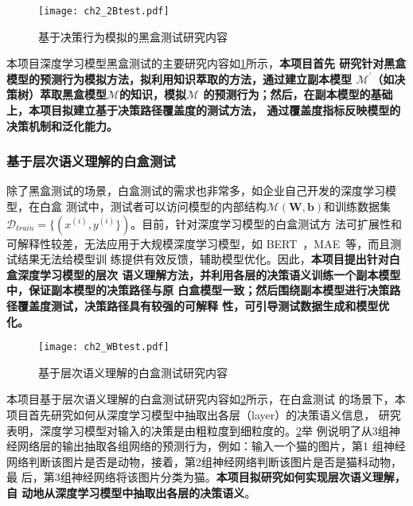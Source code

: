 \begin{figure}[htp]
    \begin{small}
        \begin{center}
            \texttt{[image: ch2\_2Btest.pdf]}
        \end{center}
        \caption{基于决策行为模拟的黑盒测试研究内容}
        \label{fig:ch2:2Btest}
    \end{small}
\end{figure}
本项目深度学习模型黑盒测试的主要研究内容如\cref{fig:ch2:2Btest}所示，\textbf{本项目首先
研究针对黑盒模型的预测行为模拟方法，拟利用知识萃取的方法，通过建立副本模型
$\mathcal M^\prime$（如决策树）萃取黑盒模型$\mathcal M$的知识，模拟$\mathcal M$
的预测行为；然后，在副本模型的基础上，本项目拟建立基于决策路径覆盖度的测试方法，
通过覆盖度指标反映模型的决策机制和泛化能力。}

\subsubsection{基于层次语义理解的白盒测试}

除了黑盒测试的场景，白盒测试的需求也非常多，如企业自己开发的深度学习模型，在白盒
测试中，测试者可以访问模型的内部结构$\mathcal M(\bm W, \bm b)$和训练数据集
$\mathcal D_{train}=\{(x^{(i)}, y^{(i)}\})$。目前，针对深度学习模型的白盒测试方
法可扩展性和可解释性较差，无法应用于大规模深度学习模型，如
BERT~\cite{kenton2019bert}，MAE~\cite{he2021masked}等，而且测试结果无法给模型训
练提供有效反馈，辅助模型优化。因此，\textbf{本项目提出针对白盒深度学习模型的层次
语义理解方法，并利用各层的决策语义训练一个副本模型中，保证副本模型的决策路径与原
白盒模型一致；然后围绕副本模型进行决策路径覆盖度测试，决策路径具有较强的可解释
性，可引导测试数据生成和模型优化。}

\begin{figure}[htp]
    \begin{small}
        \begin{center}
            \texttt{[image: ch2\_WBtest.pdf]}
        \end{center}
        \caption{基于层次语义理解的白盒测试研究内容}
        \label{fig:ch2:WBtest}
    \end{small}
\end{figure}

本项目基于层次语义理解的白盒测试研究内容如\cref{fig:ch2:WBtest}所示，在白盒测试
的场景下，本项目首先研究如何从深度学习模型中抽取出各层（layer）的决策语义信息，
研究表明，深度学习模型对输入的决策是由粗粒度到细粒度的。\cref{fig:ch2:WBtest}举
例说明了从3组神经网络层的输出抽取各组网络的预测行为，例如：输入一个猫的图片，第1
组神经网络判断该图片是否是动物，接着，第2组神经网络判断该图片是否是猫科动物，最
后，第3组神经网络将该图片分类为猫。\textbf{本项目拟研究如何实现层次语义理解，自
动地从深度学习模型中抽取出各层的决策语义}。

